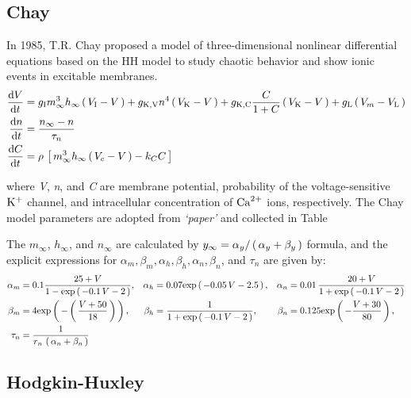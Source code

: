 \documentclass[../../Orator.tex]{subfiles}
\begin{document}
\subsection{Chay}
In 1985, T.R. Chay proposed a model of three-dimensional nonlinear differential equations based on the HH model to study chaotic behavior and show ionic events in excitable membranes. 
\begin{subequations}\label{eq:ChaySys}
    \begin{align}
        \frac{\mathrm{d}\displaystyle V}{\mathrm{d}\displaystyle t} &= g_{\mathrm{I}}  m^3_\infty h_\infty \left(\,V_{\mathrm{I}} - V\,\right) + g_{\mathrm{K, V}} n^4 \left(\,V_{\mathrm{K}} - V\,\right) + g_{\mathrm{K, C}}  \frac{C}{1+C}\left(\,V_{\mathrm{K}} - V\,\right) + g_{\mathrm{L}} \left(\,V_m - V_{\mathrm{L}}\,\right) \\ 
        \frac{\mathrm{d}\displaystyle n}{\mathrm{d}\displaystyle t} &= \frac{n_\infty - n}{\tau_n} \\
        \frac{\mathrm{d}\displaystyle C}{\mathrm{d}\displaystyle t} &= \rho \, \left[\,m^3_\infty h_\infty \left(\,V_c - V\,\right) - k_C C\,\right]
    \end{align}
\end{subequations}

where \textit{V}, \textit{n}, and \textit{C} are membrane potential, probability of the voltage-sensitive \(\mathrm{K}^+\) channel, and intracellular concentration of \(\mathrm{Ca}^{2+}\) ions, respectively. The Chay model parameters are adopted from \textit{`paper'} and collected in Table

The \(m_\infty\), \(h_\infty\), and \(n_\infty\) are calculated by \(y_\infty = \alpha_y / \left(\,\alpha_y + \beta_y\,\right) \) formula, and the explicit expressions for 
\(\alpha_m, \beta_m, \alpha_h, \beta_h, \alpha_n, \beta_n\), and \(\tau_n\) are given by:
\begin{align*}
    \alpha_m &= 0.1 \frac{ 25 + V }{1 - \mathrm{exp}\left(\,-0.1 \, V - 2\,\right)}, &
    \alpha_h &=  0.07 \mathrm{exp}\left(\,-0.05\,V -2.5\,\right), &
    \alpha_n &= 0.01 \, \frac{ 20 + V }{ 1 + \mathrm{exp}\left(\,-0.1 \, V - 2\,\right)} \\
    \beta_m  &= 4 \mathrm{exp}\left(\,-\left(\,\frac{ V + 50 }{ 18 } \,\right) \,\right), &
    \beta_h  &= \frac{ 1 }{ 1 + \mathrm{exp}\left(\,-0.1 \, V - 2\,\right)}, &
    \beta_n  &= 0.125 \mathrm{exp}\left(\,- \frac{V + 30}{80}\,\right), \\
    \tau_n &= \frac{1}{ r_n \, \left(\,\alpha_n + \beta_n\,\right) }
\end{align*}



\newpage
\subsection{Hodgkin-Huxley}\label{sec:HHMeth}
\end{document}
